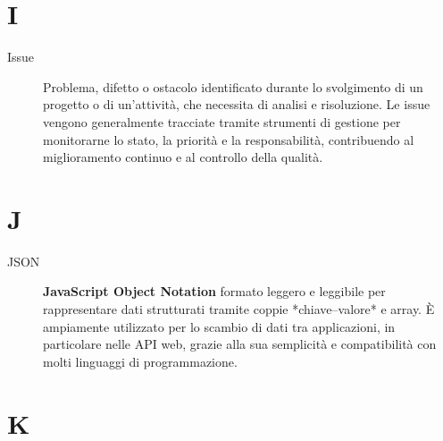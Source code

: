 \section*{I}
\begin{description}
    \item[Issue] Problema, difetto o ostacolo identificato durante lo svolgimento di un progetto o di un’attività, che necessita di analisi e risoluzione. Le issue vengono generalmente tracciate tramite strumenti di gestione per monitorarne lo stato, la priorità e la responsabilità, contribuendo al miglioramento continuo e al controllo della qualità.

\end{description}

\section*{J}
\begin{description}
    \item[JSON] \textbf{JavaScript Object Notation} formato leggero e leggibile per rappresentare dati strutturati tramite coppie *chiave–valore* e array.  
    È ampiamente utilizzato per lo scambio di dati tra applicazioni, in particolare nelle API web, grazie alla sua semplicità e compatibilità con molti linguaggi di programmazione.

\end{description}

\section*{K}

